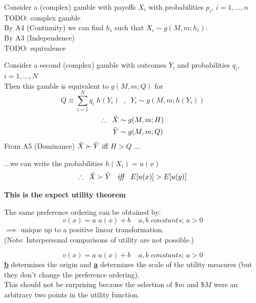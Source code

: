 \documentclass[
14pt,notheorems,hyperref={pdfauthor=whatever}
]{beamer}
\begin{document}
\begin{frame}
Consider a (complex) gamble with payoffs $X_i$ with probabilities $p_i$, $i=1,...,n$\\
TODO: complex gamble\\
By A4 (Continuity) we can find $h_i$ such that $X_i \sim g(M,m;h_i)$.\\
By A3 (Independence)\\
TODO: equivalence
\end{frame}

\begin{frame}
Consider a second (complex) gamble with outcomes $Y_i$ and probabilities $q_i$, $i=1,...,N$\\
Then this gamble is equivalent to $g(M,m;Q)$
for
\[Q \equiv \sum_{i=1}^N q_i\;h(Y_i)\;\;,\;\;Y_i\sim g(M,m;h(Y_i))\]
\begin{align*}
    \therefore \;\; \Tilde{X}&\sim g(M,m;H)\\
    \Tilde{Y}&\sim g(M,m;Q)\\
\end{align*}
From A5 (Dominance) $\Tilde{X} \succ \Tilde{Y}$ iff $H > Q$ ...
\end{frame}

\begin{frame}
...we can write the probabilities $h(X_i) = u(x)$\\
\[\therefore \;\; \Tilde{X}\succ\Tilde{Y}\;\; \textit{ iff }\;\; E[u(x)]>E[u(y)]\]
\begin{center}
    \textbf{This is the expect utility theorem}\\
\end{center}
\hfill \break
The same preference ordering can be obtained by:\\
\[v(x)=a\;u(x)+b \;\;\;\; a,b \textit{ constants; } a>0\]
$\implies$ unique up to a positive linear transformation.\\
(Note: Interpersonal comparisons of utility are not possible.)
\end{frame}

\begin{frame}
\[v(x)=a\;u(x)+b \;\;\;\; a,b \textit{ constants; } a>0\]
\hfill \break
\underline{\textbf{b}} determines the origin and \underline{\textbf{a}} determines the scale of the utility measures (but they don't change the preference ordering).\\
\hfill \break
This should not be surprising because the selection of $\$m$ and $\$M$ were an arbitrary two points in the utility function.
\end{frame}
\end{document}
